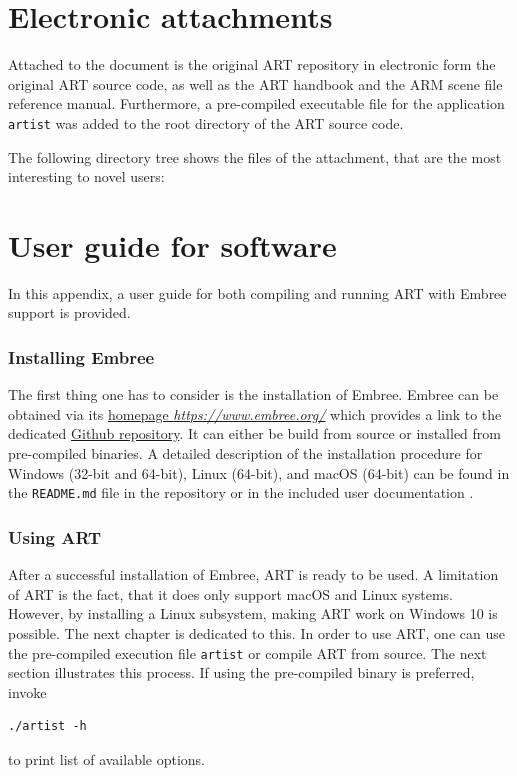 \chapter{Electronic attachments} \label{chap:attachments}
Attached to the document is the original ART repository in electronic form the original ART source code, as well as the ART handbook and the ARM scene file reference manual. Furthermore, a pre-compiled executable file for the application \texttt{artist} was added to the root directory of the ART source code.

The following directory tree shows the files of the attachment, that are the most interesting to novel users:

\medspace


\chapter{User guide for software}

In this appendix, a user guide for both compiling and running ART with Embree support is provided. 

\subsection{Installing Embree}
\label{embree}
The first thing one has to consider is the installation of Embree. Embree can be obtained via its \href{https://www.embree.org/}{homepage \emph{https://www.embree.org/}} which provides a link to the dedicated \href{https://github.com/embree/embree}{Github repository}. It can either be build from source or installed from pre-compiled binaries. A detailed description of the installation procedure for Windows (32-bit and 64-bit), Linux (64-bit), and macOS (64-bit) can be found in the \texttt{README.md} file in the repository or in the included user documentation \cite{embree2021Doc}.

\subsection{Using ART}
After a successful installation of Embree, ART is ready to be used. A limitation of ART is the fact, that it does only support macOS and Linux systems. However, by installing a Linux subsystem, making ART work on Windows 10 is possible. The next chapter is dedicated to this. 
In order to use ART, one can use the pre-compiled execution file \texttt{artist} or compile ART from source. The next section illustrates this process. If using the pre-compiled binary is preferred, invoke
\begin{Verbatim}
./artist -h
\end{Verbatim}
to print list of available options.

